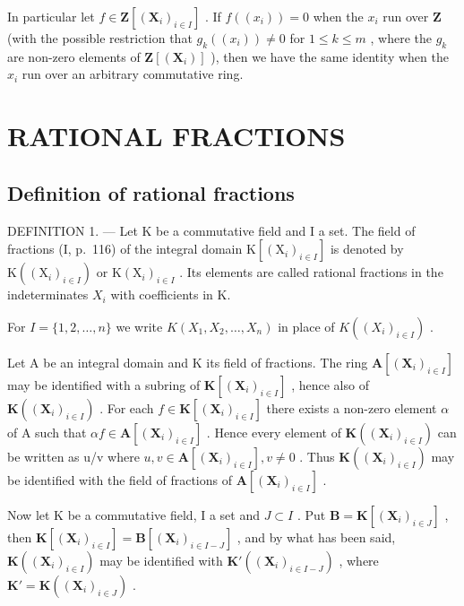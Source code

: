 In particular let \(f \in \mathbf{Z}[(\mathbf{X}_i)_{i \in I}]\) . If \(f((x_i)) = 0\) when the \(x_i\) run over \(\mathbf{Z}\) (with the possible restriction that \(g_k((x_i)) \neq 0\) for \(1 \leqslant k \leqslant m\) , where the \(g_k\) are non-zero elements of \(\mathbf{Z}[(\mathbf{X}_i)]\) ), then we have the same identity when the \(x_i\) run over an arbitrary commutative ring.

\section{RATIONAL FRACTIONS}

\subsection{Definition of rational fractions}

DEFINITION 1. --- Let K be a commutative field and I a set. The field of fractions (I, p.~116) of the integral domain \(\mathrm{K}[(\mathrm{X}_{i})_{i\in I}]\) is denoted by \(\mathrm{K}((\mathrm{X}_{i})_{i\in I})\) or \(\mathrm{K}(\mathrm{X}_{i})_{i\in I}\) . Its elements are called rational fractions in the indeterminates \(X_{i}\) with coefficients in K.

For \(I = \{1, 2, \dots, n\}\) we write \(K(X_1, X_2, \dots, X_n)\) in place of \(K((X_i)_{i \in I})\) .

Let A be an integral domain and K its field of fractions. The ring \(\mathbf{A}[(\mathbf{X}_{i})_{i\in I}]\) may be identified with a subring of \(\mathbf{K}[(\mathbf{X}_{i})_{i\in I}]\) , hence also of \(\mathbf{K}((\mathbf{X}_{i})_{i\in I})\) . For each \(f\in\mathbf{K}[(\mathbf{X}_{i})_{i\in I}]\) there exists a non-zero element \(\alpha\) of A such that \(\alpha f\in\mathbf{A}[(\mathbf{X}_{i})_{i\in I}]\) . Hence every element of \(\mathbf{K}((\mathbf{X}_{i})_{i\in I})\) can be written as u/v where \(u,v\in\mathbf{A}[(\mathbf{X}_{i})_{i\in I}],v\neq0\) . Thus \(\mathbf{K}((\mathbf{X}_{i})_{i\in I})\) may be identified with the field of fractions of \(\mathbf{A}[(\mathbf{X}_{i})_{i\in I}]\) .

Now let K be a commutative field, I a set and \(J \subset I\) . Put \(\mathbf{B} = \mathbf{K}[(\mathbf{X}_i)_{i \in J}]\) , then \(\mathbf{K}[(\mathbf{X}_i)_{i \in I}] = \mathbf{B}[(\mathbf{X}_i)_{i \in I-J}]\) , and by what has been said, \(\mathbf{K}((\mathbf{X}_i)_{i \in I})\) may be identified with \(\mathbf{K}'((\mathbf{X}_i)_{i \in I-J})\) , where \(\mathbf{K}' = \mathbf{K}((\mathbf{X}_i)_{i \in J})\) .

